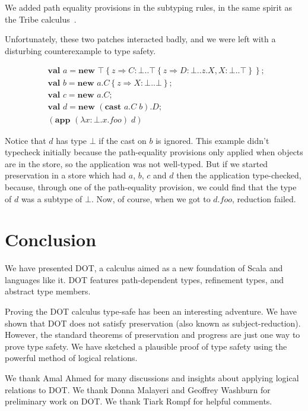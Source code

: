 \documentclass[9pt]{sigplanconf}
\newcommand{\refine}[2]{\left\{#1 \Rightarrow #2 \right\}}
\newcommand{\abs}[3]{\lambda #1\!:\!#2.#3}
\newcommand{\mlnew}[3]{\textbf{val }#1 = \textbf{new }#2 ;\;\\&#3}
\newcommand{\Ldecl}[3]{#1 : #2..#3}%
\newcommand{\Top}{\top}%
\newcommand{\Bot}{\bot}%
\newcommand{\app}[2]{(\textbf{app }#1\;#2)}
\newcommand{\cast}[2]{(\textbf{cast }#1\;#2)}
\begin{document}
We added path equality provisions in the subtyping rules, in the same
spirit as the Tribe calculus~\cite{tribe}.

Unfortunately, these two patches interacted badly, and we were left
with a disturbing counterexample to type safety.

\begin{align*}
&\mlnew a {\Top \refine z {\Ldecl C \Bot {\Top \refine z {\Ldecl D \Bot {z.X}, \Ldecl X \Bot \Top}}}}{
\mlnew b {{a.C} \refine z {\Ldecl X \Bot \Bot}}}{
\mlnew c {a.C}}{
\mlnew d {{\cast {a.C} b}.D}}{
\app {(\abs x \Bot {x.\mathit{foo}})} d
}
\end{align*}

Notice that $d$ has type $\Bot$ if the cast on $b$ is ignored. This
example didn't typecheck initially because the path-equality
provisions only applied when objects are in the store, so the
application was not well-typed. But if we started preservation in a store
which had $a$, $b$, $c$ and $d$ then the application type-checked,
because, through one of the path-equality provision, we could find that
the type of $d$ was a subtype of $\Bot$. Now, of course, when we got to
$d.\mathit{foo}$, reduction failed.

\section{Conclusion}\label{conclusion}

We have presented DOT, a calculus aimed as a new foundation of Scala
and languages like it. DOT features path-dependent types, refinement
types, and abstract type members.

Proving the DOT calculus type-safe has been an interesting
adventure. We have shown that DOT does not satisfy preservation (also
known as subject-reduction). However, the standard theorems of
preservation and progress are just one way to prove type safety. We
have sketched a plausible proof of type safety using the powerful
method of logical relations.


\acks

We thank Amal Ahmed for many discussions and insights about applying
logical relations to DOT. We thank Donna Malayeri and Geoffrey
Washburn for preliminary work on DOT. We thank Tiark Rompf for helpful
comments.



\end{document}
